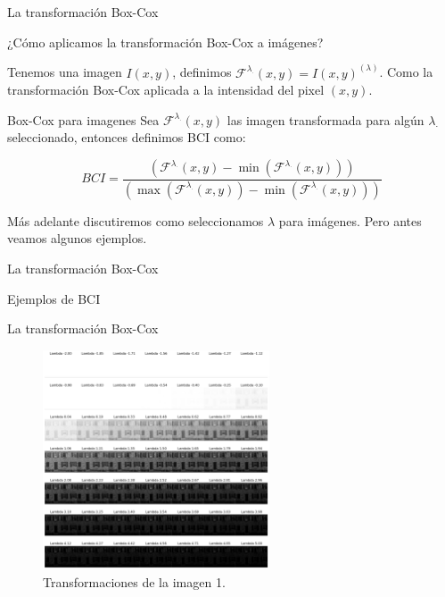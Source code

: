 \documentclass{beamer}
\begin{document}
\begin{frame}{La transformación Box-Cox}

    ¿Cómo aplicamos la transformación Box-Cox a imágenes?
    \pause

    Tenemos una imagen $I(x, y)$, definimos $\mathcal{F}^{\lambda_{\cdot}}(x, y) = I(x, y)^{(\lambda)}$. Como la transformación Box-Cox aplicada a la intensidad del pixel $(x, y)$.
    \pause
    \begin{block}{Box-Cox para imagenes}
        Sea $\mathcal{F}^{\lambda_{\cdot}}(x, y)$ las imagen transformada para alg\'un $\lambda_\cdot$ seleccionado, entonces definimos BCI como:

        \begin{equation*}
            BCI = \frac{\left(\mathcal{F}^{\lambda_{\cdot}}(x, y) - \min\left(\mathcal{F}^{\lambda_{\cdot}}(x, y)\right)\right)}{\left(\max\left(\mathcal{F}^{\lambda_{\cdot}}(x, y)\right) - \min\left(\mathcal{F}^{\lambda_{\cdot}}(x, y)\right)\right)}
        \end{equation*}
    \end{block}
    \pause
    Más adelante discutiremos como seleccionamos $\lambda$ para imágenes. Pero antes veamos algunos ejemplos.
\end{frame}

\begin{frame}{La transformación Box-Cox}
    \begin{center}
        {\Large Ejemplos de BCI}
    \end{center}
\end{frame}

\begin{frame}{La transformación Box-Cox}
    \begin{figure}
        \centering
        \includegraphics[width=0.6\textwidth]{all_lambda_1.png}
        \caption{Transformaciones de la imagen 1.}
        \label{fig:all_lambda_1}
    \end{figure}
\end{frame}
\end{document}
